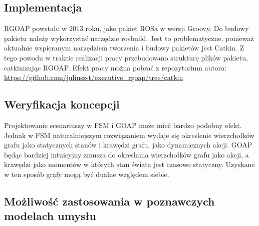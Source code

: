 \subsection{Implementacja}
RGOAP powstało w 2013 roku, jako pakiet ROSa w wersji Groovy. Do budowy pakietu należy wykorzystać narzędzie rosbuild. Jest to problematyczne, ponieważ aktualnie wspieranym narzędziem tworzenia i budowy pakietów jest Catkin. Z tego powodu w trakcie realizacji pracy przebudowano strukturę plików pakietu, catkinizując RGOAP. Efekt pracy można pobrać z repozytorium autora: \url{https://github.com/juliusz-t/executive_rgoap/tree/catkin}

\subsection{Weryfikacja koncepcji}

Projektowanie scenariuszy w FSM i GOAP może mieć bardzo podobny efekt. Jednak w FSM naturalniejszym rozwiązaniem wydaje się okreslenie wierzchołków grafu jako statycznych stanów i krawędzi grafu, jako dynamicznych akcji. GOAP będąc bardziej intuicyjny zmusza do okreslania wierzchołków grafu jako akcji, a krawędzi jako momentów w których stan świata jest czasowo statyczny. Uzyskane w ten sposób grafy mogą być dualne względem siebie.

\subsection{Możliwość zastosowania w poznawczych modelach umysłu}

